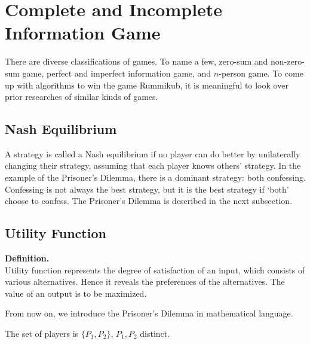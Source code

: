\documentclass[11pt]{article}
\begin{document}
	
	
	\section{Complete and Incomplete Information Game}\label{section-information}
	There are diverse classifications of games. To name a few, zero-sum and non-zero-sum game, perfect and imperfect information game, and $n$-person game.
	To come up with algorithms to win the game Rummikub, it is meaningful to look over prior researches of similar kinds of games. 
	
	\subsection{Nash Equilibrium}
	
	A strategy is called a Nash equilibrium if no player can do better by unilaterally changing their strategy, assuming that each player knows others' strategy. In the example of the Prisoner's Dilemma, there is a dominant strategy: both confessing. Confessing is not always the best strategy, but it is the best strategy if `both' choose to confess. The Prisoner's Dilemma is described in the next subsection.

	\subsection{Utility Function}
	\textbf{Definition.}\\
	Utility function represents the degree of satisfaction of an input, which consists of various alternatives. Hence it reveals the preferences of the alternatives. The value of an output is to be maximized.
	
	
	From now on, we introduce the Prisoner's Dilemma in mathematical language.
		
	The set of players is $\{P_1, P_2\}$, $P_1, P_2$ distinct.
	
\end{document}
